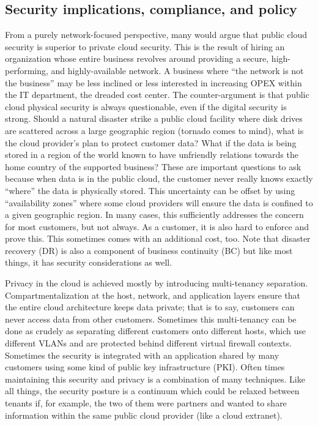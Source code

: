 \subsection{Security implications, compliance, and policy}
From a purely network-focused perspective, many would argue that public cloud
security is superior to private cloud security. This is the result of hiring
an organization whose entire business revolves around providing a secure,
high-performing, and highly-available network. A business where ``the network
is not the business'' may be less inclined or less interested in increasing
OPEX within the IT department, the dreaded cost center. The counter-argument
is that public cloud physical security is always questionable, even if the
digital security is strong. Should a natural disaster strike a public cloud
facility where disk drives are scattered across a large geographic region
(tornado comes to mind), what is the cloud provider’s plan to protect customer
data? What if the data is being stored in a region of the world known to have
unfriendly relations towards the home country of the supported business? These
are important questions to ask because when data is in the public cloud, the
customer never really knows exactly ``where'' the data is physically stored.
This uncertainty can be offset by using ``availability zones'' where some cloud
providers will ensure the data is confined to a given geographic region. In
many cases, this sufficiently addresses the concern for most customers, but
not always. As a customer, it is also hard to enforce and prove this. This
sometimes comes with an additional cost, too. Note that disaster recovery (DR)
is also a component of business continuity (BC) but like most things, it has
security considerations as well.

Privacy in the cloud is achieved mostly by introducing multi-tenancy
separation. Compartmentalization at the host, network, and application layers
ensure that the entire cloud architecture keeps data private; that is to say,
customers can never access data from other customers. Sometimes this
multi-tenancy can be done as crudely as separating different customers onto
different hosts, which use different VLANs and are protected behind different
virtual firewall contexts. Sometimes the security is integrated with an
application shared by many customers using some kind of public key
infrastructure (PKI). Often times maintaining this security and privacy is a
combination of many techniques. Like all things, the security posture is a
continuum which could be relaxed between tenants if, for example, the two of
them were partners and wanted to share information within the same public
cloud provider (like a cloud extranet).

